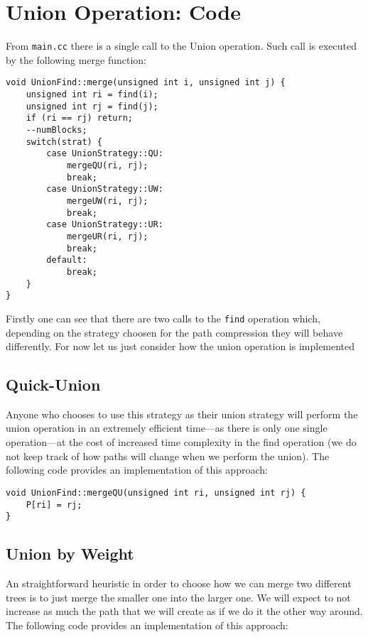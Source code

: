 \appendix
\section{Union Operation: Code}
From \texttt{main.cc} there is a single call to the Union operation. Such call is executed by the following merge function:

\begin{center}
    \begin{verbatim}
void UnionFind::merge(unsigned int i, unsigned int j) {
    unsigned int ri = find(i);
    unsigned int rj = find(j);
    if (ri == rj) return;
    --numBlocks;
    switch(strat) {
        case UnionStrategy::QU:
            mergeQU(ri, rj);
            break;
        case UnionStrategy::UW:
            mergeUW(ri, rj);
            break;
        case UnionStrategy::UR:
            mergeUR(ri, rj);
            break;
        default:
            break;
    }
}
    \end{verbatim}
\end{center}

Firstly one can see that there are two calls to the \texttt{find} operation which, depending on the strategy choosen for the path compression they will behave differently. For now let us just consider how the union operation is implemented 

\subsection{Quick-Union}
Anyone who chooses to use this strategy as their union strategy will perform the union operation in an extremely efficient time—as there is only one single operation—at the cost of increased time complexity in the find operation (we do not keep track of how paths will change when we perform the union). The following code provides an implementation of this approach:

\begin{center}
    \begin{verbatim}
void UnionFind::mergeQU(unsigned int ri, unsigned int rj) {
    P[ri] = rj;
}
    \end{verbatim}
\end{center}

\subsection{Union by Weight}
An straightforward heuristic in order to choose how we can merge two different trees is to just merge the smaller one into the larger one. We will expect to not increase as much the path that we will create as if we do it the other way around. The following code provides an implementation of this approach:

